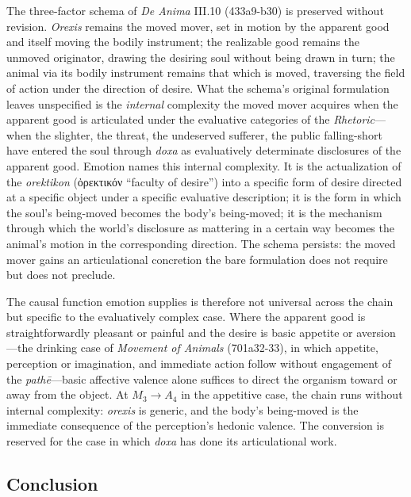 \documentclass{article}
\newcommand{\gk}[1]{{\greekfont #1}}
\begin{document}
The three-factor schema of \textit{De Anima} III.10 (433a9-b30) is preserved without revision. \textit{Orexis} remains the moved mover, set in motion by the apparent good and itself moving the bodily instrument; the realizable good remains the unmoved originator, drawing the desiring soul without being drawn in turn; the animal via its bodily instrument remains that which is moved, traversing the field of action under the direction of desire. What the schema's original formulation leaves unspecified is the \textit{internal} complexity the moved mover acquires when the apparent good is articulated under the evaluative categories of the \textit{Rhetoric}---when the slighter, the threat, the undeserved sufferer, the public falling-short have entered the soul through \textit{doxa} as evaluatively determinate disclosures of the apparent good. Emotion names this internal complexity. It is the actualization of the \textit{orektikon} (\gk{ὀρεκτικόν} ``faculty of desire'') into a specific form of desire directed at a specific object under a specific evaluative description; it is the form in which the soul's being-moved becomes the body's being-moved; it is the mechanism through which the world's disclosure as mattering in a certain way becomes the animal's motion in the corresponding direction. The schema persists: the moved mover gains an articulational concretion the bare formulation does not require but does not preclude.

The causal function emotion supplies is therefore not universal across the chain but specific to the evaluatively complex case. Where the apparent good is straightforwardly pleasant or painful and the desire is basic appetite or aversion---the drinking case of \textit{Movement of Animals} (701a32-33), in which appetite, perception or imagination, and immediate action follow without engagement of the \textit{pathē}---basic affective valence alone suffices to direct the organism toward or away from the object. At $M_3 \rightarrow A_4$ in the appetitive case, the chain runs without internal complexity: \textit{orexis} is generic, and the body's being-moved is the immediate consequence of the perception's hedonic valence. The conversion is reserved for the case in which \textit{doxa} has done its articulational work. 

\subsection{Conclusion}
\end{document}
